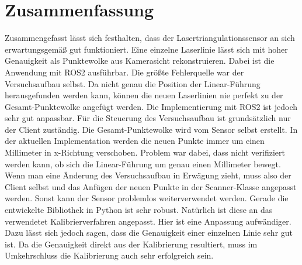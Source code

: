 \section{Zusammenfassung}\label{zusammenfassung}
	Zusammengefasst lässt sich festhalten, dass der Lasertriangulationssensor an sich erwartungsgemäß gut funktioniert. Eine einzelne Laserlinie lässt sich mit hoher Genauigkeit als Punktewolke aus Kamerasicht rekonstruieren. Dabei ist die Anwendung mit ROS2 ausführbar. Die größte Fehlerquelle war der Versuchsaufbau selbst. Da nicht genau die Position der Linear-Führung herausgefunden werden kann, können die neuen Laserlinien nie perfekt zu der Gesamt-Punktewolke angefügt werden. Die Implementierung mit ROS2 ist jedoch sehr gut anpassbar. Für die Steuerung des Versuchsaufbau ist grundsätzlich nur der Client zuständig. Die Gesamt-Punktewolke wird vom Sensor selbst erstellt. In der aktuellen Implementation werden die neuen Punkte immer um einen Millimeter in x-Richtung verschoben. Problem war dabei, dass nicht verifiziert werden kann, ob sich die Linear-Führung um genau einen Millimeter bewegt. Wenn man eine Änderung des Versuchsaufbau in Erwägung zieht, muss also der Client selbst und das Anfügen der neuen Punkte in der Scanner-Klasse angepasst werden. Sonst kann der Sensor problemlos weiterverwendet werden. Gerade die entwickelte Bibliothek in Python ist sehr robust. Natürlich ist diese an das verwendetet Kalibrierverfahren angepasst. Hier ist eine Anpassung aufwändiger. Dazu lässt sich jedoch sagen, dass die Genauigkeit einer einzelnen Linie sehr gut ist. Da die Genauigkeit direkt aus der Kalibrierung resultiert, muss im Umkehrschluss die Kalibrierung auch sehr erfolgreich sein. \newline
